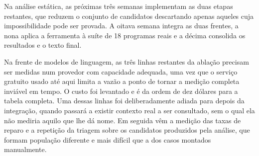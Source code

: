 \documentclass[article,12pt,oneside,a4paper,english,brazil]{abntex2}
\begin{document}
Na análise estática, as próximas três semanas implementam as duas etapas
restantes, que reduzem o conjunto de candidatos descartando apenas aqueles cuja
impossibilidade pode ser provada. A oitava semana integra as duas frentes, a
nona aplica a ferramenta à suíte de 18 programas reais e a décima consolida os
resultados e o texto final.

Na frente de modelos de linguagem, as três linhas restantes da ablação precisam
ser medidas num provedor com capacidade adequada, uma vez que o serviço gratuito
usado até aqui limita a vazão a ponto de tornar a medição completa inviável em
tempo. O custo foi levantado e é da ordem de dez dólares para a tabela completa.
Uma dessas linhas foi deliberadamente adiada para depois da integração, quando
passará a existir contexto real a ser consultado, sem o qual ela não mediria
aquilo que lhe dá nome. Em seguida vêm a medição das taxas de reparo e a
repetição da triagem sobre os candidatos produzidos pela análise, que formam
população diferente e mais difícil que a dos casos montados manualmente.
\end{document}
